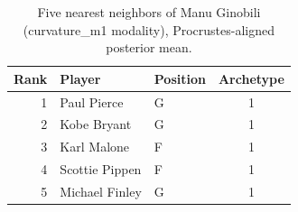 \begin{table}[htbp]
  \centering\small
  \begin{tabular}{rllc}
    \toprule
    Rank & Player & Position & Archetype \\
    \midrule
    1 & Paul Pierce & G & 1 \\
    2 & Kobe Bryant & G & 1 \\
    3 & Karl Malone & F & 1 \\
    4 & Scottie Pippen & F & 1 \\
    5 & Michael Finley & G & 1 \\
    \bottomrule
  \end{tabular}
  \caption{Five nearest neighbors of Manu Ginobili (curvature_m1 modality), Procrustes-aligned posterior mean.}
  \label{tab:Manu_Ginobili_neighbors_curvature_m1}
\end{table}

